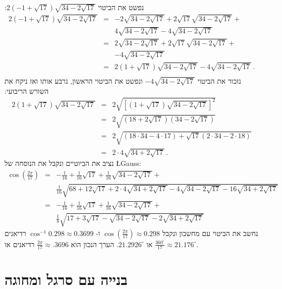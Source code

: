 \documentclass[11pt,a4paper]{article}
\newenvironment{form}[1]{%
\begin{displaymath}%
\renewcommand{\arraystretch}{#1}%
\begin{array}{lcl}}%
{\end{array}%
\end{displaymath}%
}
\newcommand*{\disfrac}[2]{\displaystyle\frac{#1}{#2}}
\begin{document}
נפשט את הביטוי
$2(-1+\sqrt{17})\sqrt{34-2\sqrt{17}}$:
\begin{form}{1.7}
2(-1+\sqrt{17})\sqrt{34-2\sqrt{17}} &=&
-2\sqrt{34-2\sqrt{17}} +2\sqrt{17}\sqrt{34-2\sqrt{17}}+\\
&&4\sqrt{34-2\sqrt{17}}-4\sqrt{34-2\sqrt{17}}\\
&=&
2\sqrt{34-2\sqrt{17}} +2\sqrt{17}\sqrt{34-2\sqrt{17}}+\\
&&-4\sqrt{34-2\sqrt{17}}\\
&=&2(1+\sqrt{17})\sqrt{34-2\sqrt{17}}-4\sqrt{34-2\sqrt{17}}\,.\\
\end{form}
נזכור את הביטוי
$-4\sqrt{34-2\sqrt{17}}$
ונפשט את הביטוי הראשון, נרבע אותו ואז ניקח את השורש הריבועי:
\begin{form}{1.8}
2(1+\sqrt{17})\sqrt{34-2\sqrt{17}}&=&
2\sqrt{\left[(1+\sqrt{17})\sqrt{34-2\sqrt{17}}\right]^2}\\
&=&2\sqrt{(18+2\sqrt{17})(34-2\sqrt{17})}\\
&=&2\sqrt{(18\cdot 34-4\cdot17)+\sqrt{17}(2\cdot 34 - 2\cdot 18)}\\
&=&2\cdot 4\sqrt{34+2\sqrt{17}}\,.
\end{form}
נציב את הביוטיים ונקבל את הנוסחה של \L{Gauss}:
\begin{form}{2.2}
\cos\left(\disfrac{2\pi}{17}\right) &=& 
-\disfrac{1}{16}+\disfrac{1}{16}\sqrt{17} + 
     \disfrac{1}{16}\sqrt{34-2\sqrt{17}}
    + \\
    &&
     \disfrac{1}{16}\sqrt{
     68+12\sqrt{17} + 
     2\cdot 4\sqrt{34+2\sqrt{17}}-4\sqrt{34-2\sqrt{17}}
   -16
     \sqrt{34+2\sqrt{17}}
   }\\
&=&-\disfrac{1}{16}+\frac{1}{16}\sqrt{17} + 
     \disfrac{1}{16}\sqrt{34-2\sqrt{17}}
    + \\
    &&
     \disfrac{1}{8}\sqrt{
     17+3\sqrt{17} - 
     \sqrt{34-2\sqrt{17}}
   -2
     \sqrt{34+2\sqrt{17}}
   }
\end{form}
נחשב את הביטוי עם מחשבון ונקבל
$\cos\left(\disfrac{2\pi}{17}\right)\approx 0.298$ 
ו-%
$\cos^{-1}0.298\approx 0.3699$ 
רדיאנים או
$21.2926^\circ$.
הערך הנכון הוא
$\disfrac{2\pi}{17}\approx .3696$ 
רדיאנים או
$\disfrac{360^\circ}{17}\approx 21.176^\circ$.

\section{בנייה עם סרגל ומחוגה}\label{s.construction}
\end{document}
